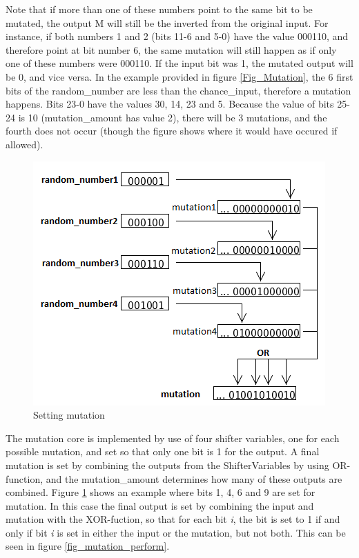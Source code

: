 Note that if more than one of these numbers point to the same bit to be mutated, the output M will still be the inverted from the original input. 
For instance, if both numbers 1 and 2 (bits 11-6 and 5-0) have the value 000110, and therefore point at bit number 6, the same mutation will still happen as if only one of these numbers were 000110. 
If the input bit was 1, the mutated output will be 0, and vice versa.
In the example provided in figure \ref{Fig_Mutation}, the 6 first bits of the random\_number are less than the chance\_input, therefore a mutation happens. Bits 23-0 have the values 30, 14, 23 and 5. 
Because the value of bits 25-24 is 10 (mutation\_amount has value 2), there will be 3 mutations, and the fourth does not occur (though the figure shows where it would have occured if allowed).

\begin{figure}[H]
\includegraphics[width=\textwidth]{fpga/fig/mutation_mask.png}
\caption{Setting mutation}
\label{fig_mutation_mask}
\end{figure}

The mutation core is implemented by use of four shifter variables, one for each possible mutation, and set so that only one bit is 1 for the output. 
A final mutation is set by combining the outputs from the ShifterVariables by using OR-function, and the mutation\_amount determines how many of these outputs are combined. Figure \ref{fig_mutation_mask} shows an example where bits 1, 4, 6 and 9 are set for mutation. 
In this case the final output is set by combining the input and mutation with the XOR-fuction, so that for each bit \emph{i}, the bit is set to 1 if and only if bit \emph{i} is set in either the input or the mutation, but not both. This can be seen in figure \ref{fig_mutation_perform}.

